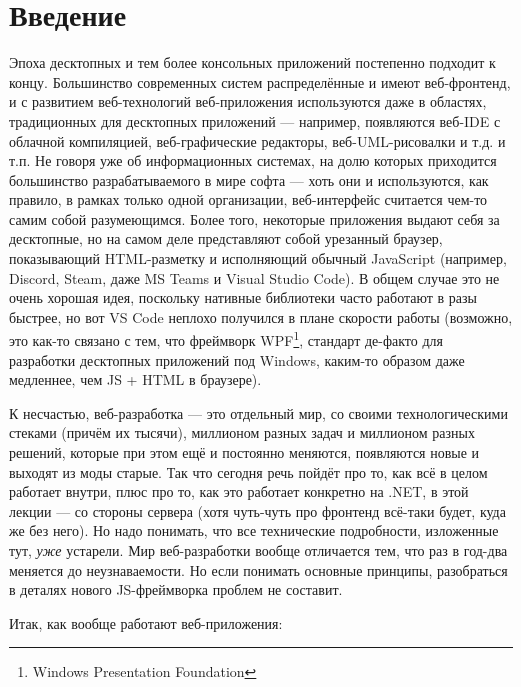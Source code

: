 \documentclass{../../text-style}
\begin{document}
\maketitle
\thispagestyle{empty}

\section{Введение}

Эпоха десктопных и тем более консольных приложений постепенно подходит к концу. Большинство современных систем распределённые и имеют веб-фронтенд, и с развитием веб-технологий веб-приложения используются даже в областях, традиционных для десктопных приложений --- например, появляются веб-IDE с облачной компиляцией, веб-графические редакторы, веб-UML-рисовалки и т.д. и т.п. Не говоря уже об информационных системах, на долю которых приходится большинство разрабатываемого в мире софта --- хоть они и используются, как правило, в рамках только одной организации, веб-интерфейс считается чем-то самим собой разумеющимся. Более того, некоторые приложения выдают себя за десктопные, но на самом деле представляют собой урезанный браузер, показывающий HTML-разметку и исполняющий обычный JavaScript (например, Discord, Steam, даже MS Teams и Visual Studio Code). В общем случае это не очень хорошая идея, поскольку нативные библиотеки часто работают в разы быстрее, но вот VS Code неплохо получился в плане скорости работы (возможно, это как-то связано с тем, что фреймворк WPF\footnote{Windows Presentation Foundation}, стандарт де-факто для разработки десктопных приложений под Windows, каким-то образом даже медленнее, чем JS + HTML в браузере).

К несчастью, веб-разработка --- это отдельный мир, со своими технологическими стеками (причём их тысячи), миллионом разных задач и миллионом разных решений, которые при этом ещё и постоянно меняются, появляются новые и выходят из моды старые. Так что сегодня речь пойдёт про то, как всё в целом работает внутри, плюс про то, как это работает конкретно на .NET, в этой лекции --- со стороны сервера (хотя чуть-чуть про фронтенд всё-таки будет, куда же без него). Но надо понимать, что все технические подробности, изложенные тут, \emph{уже} устарели. Мир веб-разработки вообще отличается тем, что раз в год-два меняется до неузнаваемости. Но если понимать основные принципы, разобраться в деталях нового JS-фреймворка проблем не составит.

Итак, как вообще работают веб-приложения:
\end{document}
